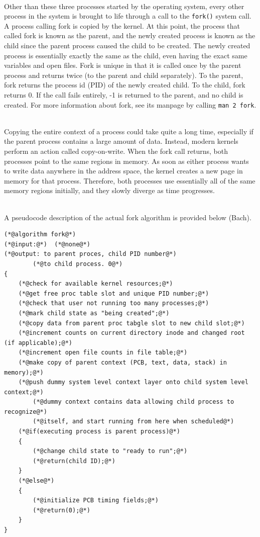 \documentclass[12pt]{extarticle}
\newenvironment{myindentpar}[1]%
 {\begin{list}{}%
         {\setlength{\leftmargin}{#1}}%
         \item[]%
 }
 {\end{list}}
\newcommand{\code}[1]{\colorbox{codegray}{\texttt{#1}}}
\begin{document}
\begin{myindentpar}{5mm}
    \ \\
    Other than these three processes started by the operating system, every other process in the system is brought to life through a call to the \code{fork()} system call.  A process calling fork is copied by the kernel.  At this point, the process that called fork is known as the parent, and the newly created process is known as the child since the parent process caused the child to be created.  The newly created process is essentially exactly the same as the child, even having the exact same variables and open files.  Fork is unique in that it is called once by the parent process and returns twice (to the parent and child separately).  To the parent, fork returns the process id (PID) of the newly created child.  To the child, fork returns 0.  If the call fails entirely, -1 is returned to the parent, and no child is created.  For more information about fork, see its manpage by calling \code{man 2 fork}.  
    
    \ \\
    Copying the entire context of a process could take quite a long time, especially if the parent process contains a large amount of data.  Instead, modern kernels perform an action called copy-on-write.  When the fork call returns, both processes point to the same regions in memory.  As soon as either process wants to write data anywhere in the address space, the kernel creates a new page in memory for that process.  Therefore, both processes use essentially all of the same memory regions initially, and they slowly diverge as time progresses.  
    
    \ \\
    A pseudocode description of the actual fork algorithm is provided below (Bach).  
    \vspace{5mm}

\begin{lstlisting}[frame=single]
(*@algorithm fork@*)
(*@input:@*)  (*@none@*)
(*@output: to parent proces, child PID number@*)
        (*@to child process. 0@*)
{
    (*@check for available kernel resources;@*)
    (*@get free proc table slot and unique PID number;@*)
    (*@check that user not running too many processes;@*)
    (*@mark child state as "being created";@*)
    (*@copy data from parent proc tabgle slot to new child slot;@*)
    (*@increment counts on current directory inode and changed root (if applicable);@*)
    (*@increment open file counts in file table;@*)
    (*@make copy of parent context (PCB, text, data, stack) in memory);@*)
    (*@push dummy system level context layer onto child system level context;@*)
        (*@dummy context contains data allowing child process to recognize@*)
        (*@itself, and start running from here when scheduled@*)
    (*@if(executing process is parent process)@*)
    {
        (*@change child state to "ready to run";@*)
        (*@return(child ID);@*)
    }
    (*@else@*)
    {
        (*@initialize PCB timing fields;@*)
        (*@return(0);@*)
    }
}
\end{lstlisting}
    

\end{myindentpar}
\end{document}
